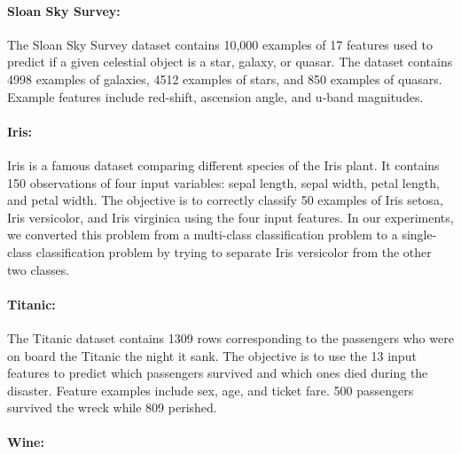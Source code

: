 \paragraph{Sloan Sky Survey:} \citep{Blanton2017SloanUniverse} The Sloan Sky Survey dataset contains 10,000 examples of 17 features used to predict if a given celestial object is a star, galaxy, or quasar. The dataset contains 4998 examples of galaxies, 4512 examples of stars, and 850 examples of quasars. Example features include red-shift, ascension angle, and u-band magnitudes. 

\paragraph{Iris:} \citep{Fisher1936TheProblems} Iris is a famous dataset comparing different species of the Iris plant. It contains 150 observations of four input variables: sepal length, sepal width, petal length, and petal width. The objective is to correctly classify 50 examples of Iris setosa, Iris versicolor, and Iris virginica using the four input features. In our experiments, we converted this problem from a multi-class classification problem to a single-class classification problem by trying to separate Iris versicolor from the other two classes. 

\paragraph{Titanic:} \citep{Stanford2019AProbability} The Titanic dataset contains 1309 rows corresponding to the passengers who were on board the Titanic the night it sank. The objective is to use the 13 input features to predict which passengers survived and which ones died during the disaster. Feature examples include sex, age, and ticket fare. 500 passengers survived the wreck while 809 perished. 

\paragraph{Wine:} \citep{Forina1991UCISet} 


